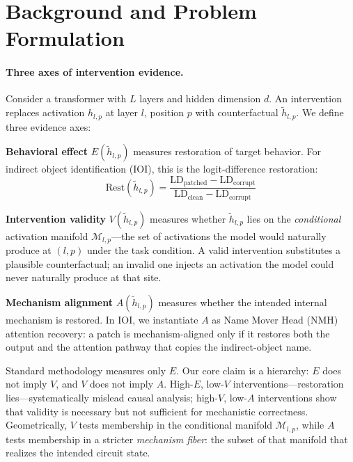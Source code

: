 \documentclass{article}
\newcommand{\rest}{\text{Rest}}
\newcommand{\manifold}{\mathcal{M}}
\begin{document}
\section{Background and Problem Formulation}
\label{sec:background}

\paragraph{Three axes of intervention evidence.}
Consider a transformer with $L$ layers and hidden dimension $d$. An intervention replaces activation $h_{l,p}$ at layer $l$, position $p$ with counterfactual $\tilde{h}_{l,p}$. We define three evidence axes:

\textbf{Behavioral effect} $E(\tilde{h}_{l,p})$ measures restoration of target behavior. For indirect object identification (IOI), this is the logit-difference restoration:
\begin{equation}
\rest(\tilde{h}_{l,p}) = \frac{\text{LD}_{\text{patched}} - \text{LD}_{\text{corrupt}}}{\text{LD}_{\text{clean}} - \text{LD}_{\text{corrupt}}}
\end{equation}

\textbf{Intervention validity} $V(\tilde{h}_{l,p})$ measures whether $\tilde{h}_{l,p}$ lies on the \emph{conditional} activation manifold $\manifold_{l,p}$---the set of activations the model would naturally produce at $(l, p)$ under the task condition. A valid intervention substitutes a plausible counterfactual; an invalid one injects an activation the model could never naturally produce at that site.

\textbf{Mechanism alignment} $A(\tilde{h}_{l,p})$ measures whether the intended internal mechanism is restored. In IOI, we instantiate $A$ as Name Mover Head (NMH) attention recovery: a patch is mechanism-aligned only if it restores both the output and the attention pathway that copies the indirect-object name.

Standard methodology measures only $E$. Our core claim is a hierarchy: $E$ does not imply $V$, and $V$ does not imply $A$. High-$E$, low-$V$ interventions---restoration lies---systematically mislead causal analysis; high-$V$, low-$A$ interventions show that validity is necessary but not sufficient for mechanistic correctness. Geometrically, $V$ tests membership in the conditional manifold $\manifold_{l,p}$, while $A$ tests membership in a stricter \emph{mechanism fiber}: the subset of that manifold that realizes the intended circuit state.
\end{document}
